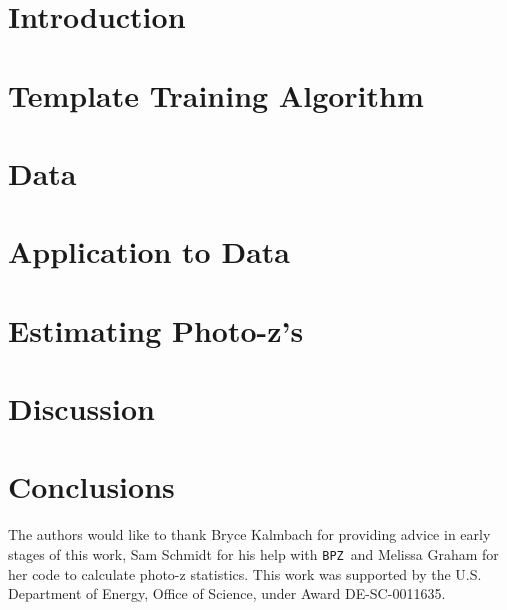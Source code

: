 \documentclass[twocolumn]{aastex63}
\newcommand{\pzcode}[1]{\texttt{#1}}
\newcommand{\bpz}{\pzcode{BPZ}}
\begin{document}



\section{Introduction}
    
    
\section{Template Training Algorithm}
    
        
\section{Data}
    

\section{Application to Data}
      
    
\section{Estimating Photo-z's}
    

\section{Discussion}
    
    
\section{Conclusions}
    

\acknowledgments

The authors would like to thank Bryce Kalmbach for providing advice in early stages of this work, Sam Schmidt for his help with \bpz\, and Melissa Graham for her code to calculate photo-z statistics. This work was supported by the U.S. Department of Energy, Office of Science, under Award DE-SC-0011635.
\end{document}
